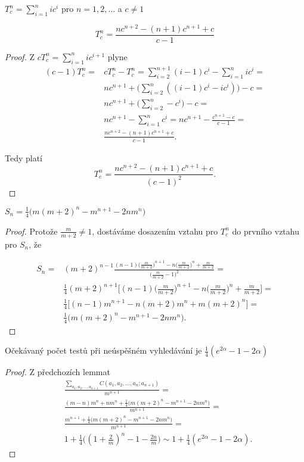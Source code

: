 \documentclass[a4paper,12pt]{article}
\begin{document}
\begin{definice}
    $T_c^n=\sum_{i=1}^nic^i$ pro $n=1,2,\dots$ a $c\ne 1$
\end{definice}

\begin{lemma}
    $$T_c^n = \frac {nc^{n+2}-(n+1)c^{n+1}+c}{c-1}$$
\end{lemma}

\begin{proof}
Z $cT_c^n=\sum_{i=1}^nic^{i+1}$ plyne 
\begin{align*}(c-1)T_c^n=&cT_c^n-T_c^n=\sum_{i=2}^{n+1}(i-1)c^i-\sum_{i
=1}^nic^i=\\
&nc^{n+1}+\big(\sum_{i=2}^n((i-1)c^i-ic^i)\big)-c=\\
&nc^{n+1}+\big(\sum_{i=2}^n-c^i\big)-c=\\
&nc^{n+1}-\sum_{i=1}^nc^i=nc^{n+1}-\frac {c^{n+1}-c}{c-1}=\\
&\frac {nc^{n+2}-(n+1)c^{n+1}+c}{c-1}.\end{align*}

Tedy platí 
$$T_c^n=\frac {nc^{n+2}-(n+1)c^{n+1}+c}{(c-1)^2}.$$
\end{proof}

\begin{lemma}
    $S_n = \frac 14\big(m(m+2)^n-m^{n+1}-2nm^n\big)$
\end{lemma}

\begin{proof}
Protože $\frac m{m+2}\ne 1$, dostáváme dosazením vztahu pro $T_c^n$ do prvního vztahu pro $S_n$, že 

\begin{align*} S_n=&(m+2)^{n-1}\frac {(n-1)\big(\frac m{m+2}\big)^{n+1}
-n\big(\frac m{m+2}\big)^n+\frac m{m+2}}{\big(\frac m{m+2}-1\big)^
2}=\\
&\frac 14(m+2)^{n+1}\big[(n-1)\big(\frac m{m+2}\big)^{n+1}-n\big(\frac 
m{m+2}\big)^n+\frac m{m+2}\big]=\\
&\frac 14\big[(n-1)m^{n+1}-n(m+2)m^n+m(m+2)^n\big]=\\
&\frac 14\big(m(m+2)^n-m^{n+1}-2nm^n\big).\end{align*}
\end{proof}

\begin{veta}
    Očekávaný počet testů při neúspěšném 
    vyhledávání je $\frac 14(e^{2\alpha}-1-2\alpha )$
\end{veta}

\begin{proof}
    Z předchozích lemmat
\begin{align*}&\frac {\sum_{a_1,a_2,\dots
       ,a_{n+1}} C(a_1,a_2,\dots,a_n;a_{n+1})}{m^{n+1}}=\\
    &\frac {(m-n)m^n+nm^n+\frac 14\big(m(m+2)^n-m^{n+1}-2nm^n\big
)}{m^{n+1}}=\\
&\frac {m^{n+1}+\frac 14\big(m(m+2)^n-m^{n+1}-2nm^n\big)}{m^{n+1}}
=\\
&1+\frac 14\big((1+\frac 2m)^n-1-\frac {2n}m\big)\sim 1+\frac 14(
e^{2\alpha}-1-2\alpha ).\end{align*}
\end{proof}
\end{document}

